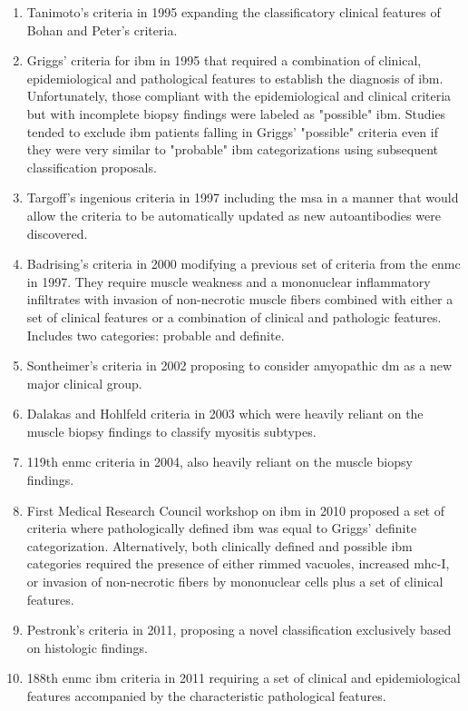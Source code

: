 \begin{enumerate}
	\item Tanimoto's criteria in 1995\cite{Tanimoto1995} expanding the classificatory clinical features of Bohan and Peter's criteria.
	
	\item Griggs' criteria for \gls{ibm} in 1995\cite{Griggs1995} that required a combination of clinical, epidemiological and pathological features to establish the diagnosis of \gls{ibm}. Unfortunately, those compliant with the epidemiological and clinical criteria but with incomplete biopsy findings were labeled as "possible" \gls{ibm}. Studies tended to exclude \gls{ibm} patients falling in Griggs' "possible" criteria even if they were very similar to "probable" \gls{ibm} categorizations using subsequent classification proposals.
	
	\item Targoff's ingenious criteria in 1997\cite{Targoff1997} including the \gls{msa} in a manner that would allow the criteria to be automatically updated as new autoantibodies were discovered.
	
	\item Badrising's criteria in 2000\cite{Badrising2000} modifying a previous set of criteria from the \gls{enmc} in 1997.\cite{Emery1997} They require muscle weakness and a mononuclear inflammatory infiltrates with invasion of non-necrotic muscle fibers combined with either a set of clinical features or a combination of clinical and pathologic features. Includes two categories: probable and definite.
	
	\item Sontheimer's criteria in 2002\cite{Sontheimer2002} proposing to consider amyopathic \gls{dm} as a new major clinical group.
	
	\item Dalakas and Hohlfeld criteria in 2003\cite{Dalakas2003} which were heavily reliant on the muscle biopsy findings to classify myositis subtypes.
	
	\item 119th \gls{enmc} criteria in 2004,\cite{Hoogendijk2004} also heavily reliant on the muscle biopsy findings.
	
	\item First Medical Research Council workshop on \gls{ibm} in 2010\cite{HiltonJones2010} proposed a set of criteria where pathologically defined \gls{ibm} was equal to Griggs' definite categorization. Alternatively, both clinically defined and possible \gls{ibm} categories required the presence of either rimmed vacuoles, increased \gls{mhc}-I, or invasion of non-necrotic fibers by mononuclear cells plus a set of clinical features.
	
	\item Pestronk's criteria in 2011,\cite{Pestronk2011} proposing a novel classification exclusively based on histologic findings.
	
	\item 188th \gls{enmc} \gls{ibm} criteria in 2011\cite{Rose2013} requiring a set of clinical and epidemiological features accompanied by the characteristic pathological features.
\end{enumerate}

